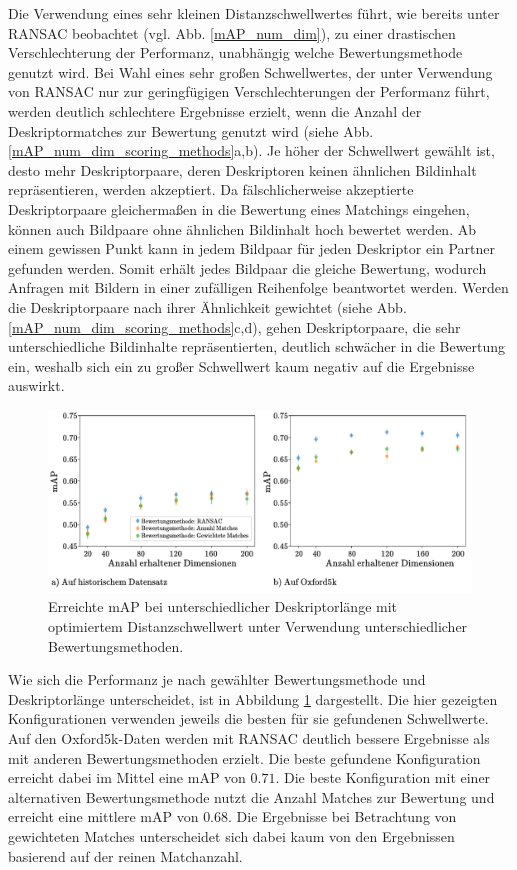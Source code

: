 Die Verwendung eines sehr kleinen Distanzschwellwertes führt, wie bereits unter RANSAC beobachtet (vgl. Abb. \ref{mAP_num_dim}), zu einer drastischen Verschlechterung der Performanz, unabhängig welche Bewertungsmethode genutzt wird. Bei Wahl eines sehr großen Schwellwertes, der unter Verwendung von RANSAC nur zur geringfügigen Verschlechterungen der Performanz führt, werden deutlich schlechtere Ergebnisse erzielt, wenn die Anzahl der Deskriptormatches zur Bewertung genutzt wird (siehe Abb. \ref{mAP_num_dim_scoring_methods}a,b). Je höher der Schwellwert gewählt ist, desto mehr Deskriptorpaare, deren Deskriptoren keinen ähnlichen Bildinhalt repräsentieren, werden akzeptiert. Da fälschlicherweise akzeptierte Deskriptorpaare gleichermaßen in die Bewertung eines Matchings eingehen, können auch Bildpaare ohne ähnlichen Bildinhalt hoch bewertet werden. Ab einem gewissen Punkt kann in jedem Bildpaar für jeden Deskriptor ein Partner gefunden werden. Somit erhält jedes Bildpaar die gleiche Bewertung, wodurch Anfragen mit Bildern in einer zufälligen Reihenfolge beantwortet werden. Werden die Deskriptorpaare nach ihrer Ähnlichkeit gewichtet (siehe Abb. \ref{mAP_num_dim_scoring_methods}c,d), gehen Deskriptorpaare, die sehr unterschiedliche Bildinhalte repräsentierten, deutlich schwächer in die Bewertung ein, weshalb sich ein zu großer Schwellwert kaum negativ auf die Ergebnisse auswirkt.
\\
\begin{figure}[h]
\includegraphics[scale=0.74]{compare_scoring_methods}
\caption{Erreichte mAP bei unterschiedlicher Deskriptorlänge mit optimiertem Distanzschwellwert unter Verwendung unterschiedlicher Bewertungsmethoden.}
\label{compare_scoring_methods}
\end{figure}
Wie sich die Performanz je nach gewählter Bewertungsmethode und Deskriptorlänge unterscheidet, ist in Abbildung \ref{compare_scoring_methods} dargestellt. Die hier gezeigten Konfigurationen verwenden jeweils die besten für sie gefundenen Schwellwerte. Auf den Oxford5k-Daten werden mit RANSAC deutlich bessere Ergebnisse als mit anderen Bewertungsmethoden erzielt. Die beste gefundene Konfiguration erreicht dabei im Mittel eine mAP von $0.71$. Die beste Konfiguration mit einer alternativen Bewertungsmethode nutzt die Anzahl Matches zur Bewertung und erreicht eine mittlere mAP von $0.68$. Die Ergebnisse bei Betrachtung von gewichteten Matches unterscheidet sich dabei kaum von den Ergebnissen basierend auf der reinen Matchanzahl.
